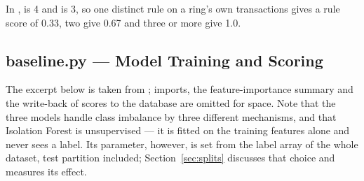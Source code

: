 \noindent In ,  is 4 and  is 3, so one distinct rule on a ring's own transactions gives a rule score of 0.33, two give 0.67 and three or more give 1.0.

\subsection{baseline.py --- Model Training and Scoring}
The excerpt below is taken from ; imports, the feature-importance summary and the write-back of scores to the database are omitted for space. Note that the three models handle class imbalance by three different mechanisms, and that Isolation Forest is unsupervised --- it is fitted on the training features alone and never sees a label. Its  parameter, however, is set from the label array of the whole dataset, test partition included; Section~\ref{sec:splits} discusses that choice and measures its effect.

